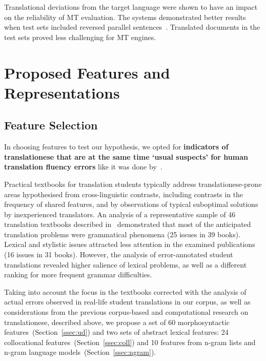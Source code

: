 Translational deviations from the target language were shown to have an impact on the reliability of MT evaluation. The systems demonstrated better results when test sets included reversed parallel sentences~\citep{Zhang2019, Graham2020}. Translated documents in the test sets proved less challenging for MT engines.


\section{\label{sec:myfeats}Proposed Features and Representations}

\subsection{\label{ssec:select}Feature Selection}
In choosing features to test our hypothesis, we opted for \textbf{indicators of translationese that are at the same time `usual suspects' for human translation fluency errors} like it was done by~\citet{Rabadan2009}.

Practical textbooks for translation students typically address translationese-prone areas hypothesised from cross-linguistic contrasts, including contrasts in the frequency of shared features, and by observations of typical suboptimal solutions by inexperienced translators. 
An analysis of a representative sample of 46 translation textbooks described in~\citet[see Table 4]{Kunilovskaya2022err} demonstrated that most of the anticipated translation problems were grammatical phenomena (25 issues in 39 books). Lexical and stylistic issues attracted less attention in the examined publications (16 issues in 31 books). However, the analysis of error-annotated student translations revealed higher salience of lexical problems, as well as a different ranking for more frequent grammar difficulties. 

Taking into account the focus in the textbooks corrected with the analysis of actual errors observed in real-life student translations in our corpus, as well as considerations from the previous corpus-based and computational research on translationese, described above, we propose a set of 60 morphosyntactic features~(Section~\ref{ssec:ud}) and two sets of abstract lexical features: 24 collocational features~(Section~\ref{ssec:coll}) and 10 features from n-gram lists and n-gram language models~(Section~\ref{ssec:ngram}).

